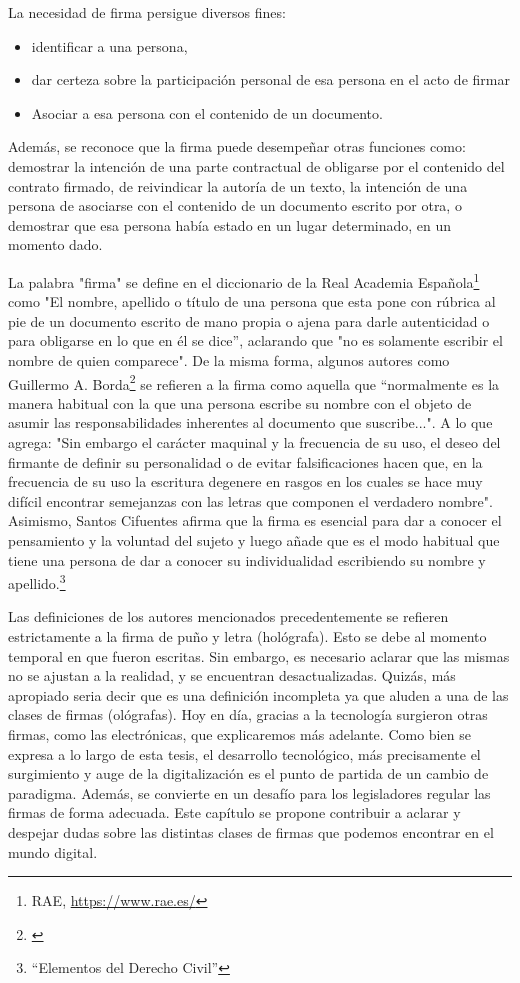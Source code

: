 \documentclass[12pt]{report} %
\begin{document}
La necesidad de firma persigue diversos fines:

\begin{itemize}
    \item identificar a una persona,
    \item dar certeza sobre la participación personal de esa persona en el acto de firmar
    \item Asociar a esa persona con el contenido de un documento.
    
\end{itemize}

Además, se reconoce que la firma puede desempeñar otras funciones como: demostrar la intención de una parte contractual de obligarse por el contenido del contrato firmado, de reivindicar la autoría de un texto, la intención de una persona de asociarse con el contenido de un documento escrito por otra, o demostrar que esa persona había estado en un lugar determinado, en un momento dado.

La palabra "firma" se define en el diccionario de la Real Academia Española\footnote{RAE, \url{https://www.rae.es/}}  como "El nombre, apellido o título de una persona que esta pone con rúbrica al pie de un documento escrito de mano propia o ajena para darle autenticidad o para obligarse en lo que en él se dice”, aclarando que "no es solamente escribir el nombre de quien comparece".  De la misma forma, algunos autores como  Guillermo A. Borda\footnote{\cite{Borda1999}} se refieren a la firma como aquella que “normalmente es la manera habitual con la que una persona escribe su nombre con el objeto de asumir las responsabilidades inherentes al documento que suscribe...". A lo que agrega: "Sin embargo el carácter maquinal y la frecuencia de su uso, el deseo del firmante de definir su personalidad o de evitar falsificaciones hacen que, en la frecuencia de su uso la escritura degenere en rasgos en los cuales se hace muy difícil encontrar semejanzas con las letras que componen el verdadero nombre".   Asimismo, Santos Cifuentes afirma que la firma es esencial para dar a conocer el pensamiento y la voluntad del sujeto y luego añade que es el modo habitual que tiene una persona de dar a conocer su individualidad escribiendo su nombre y apellido.\footnote{\cite{Santos1999}“Elementos del Derecho Civil”} 

  Las definiciones de los autores mencionados precedentemente se refieren estrictamente a la firma de puño y letra (hológrafa). Esto se debe al momento temporal en que fueron escritas. Sin embargo, es necesario aclarar que las mismas no se ajustan a la realidad, y se encuentran desactualizadas. Quizás, más apropiado seria decir que es una definición incompleta ya que aluden a una de las clases de firmas (ológrafas). Hoy en día, gracias a la tecnología surgieron otras firmas, como las electrónicas, que explicaremos más adelante. 
  Como bien se expresa a lo largo de esta tesis, el desarrollo tecnológico, más precisamente el surgimiento y auge de la digitalización es el punto de partida de un cambio de paradigma. Además, se convierte en un desafío para los legisladores regular las firmas de forma adecuada. Este capítulo se propone contribuir a aclarar y despejar dudas sobre las distintas clases de firmas que podemos encontrar en el mundo digital.
 
\end{document}
